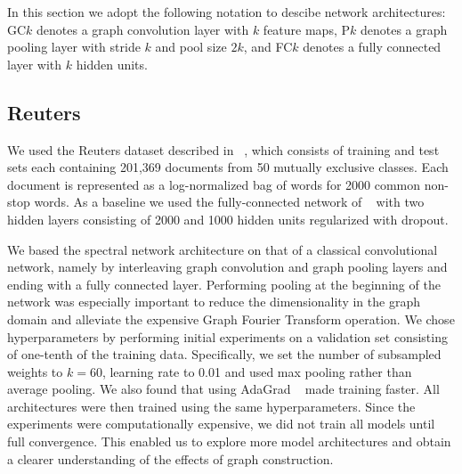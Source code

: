 In this section we adopt the following notation to descibe network architectures: GC$k$ denotes a graph convolution layer with $k$ feature maps, P$k$ denotes a graph pooling layer with stride $k$ and pool size $2k$, and FC$k$ denotes a fully connected layer with $k$ hidden units.


\subsection{Reuters}

We used the Reuters dataset described in ~\cite{Hinton2012}, which consists of training and test sets each containing 201,369 documents from 50 mutually exclusive classes. Each document is represented as a log-normalized bag of words for 2000 common non-stop words. As a baseline we used the fully-connected network of ~\cite{Hinton2012} with two hidden layers consisting of 2000 and 1000 hidden units regularized with dropout.  

We based the spectral network architecture on that of a classical convolutional network, namely by interleaving graph convolution and graph pooling layers and ending with a fully connected layer. Performing pooling at the beginning of the network was especially important to reduce the dimensionality in the graph domain and alleviate the expensive Graph Fourier Transform operation.  We chose hyperparameters by performing initial experiments on a validation set consisting of one-tenth of the training data. Specifically, we set the number of subsampled weights to $k=60$, learning rate to 0.01 and used max pooling rather than average pooling. We also found that using AdaGrad ~\cite{adagrad} made training faster. All architectures were then trained using the same hyperparameters.
Since the experiments were computationally expensive, we did not train all models until full convergence. This enabled us to explore more model architectures and obtain a clearer understanding of the effects of graph construction.  

